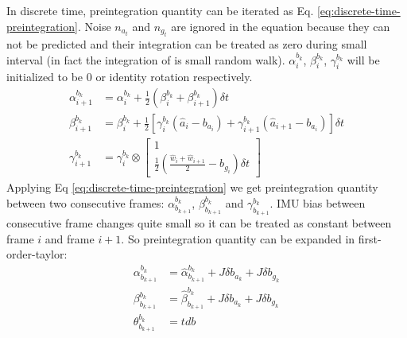 In discrete time, preintegration quantity can be iterated as Eq. \ref{eq:discrete-time-preintegration}. Noise $n_{a_t}$ and $n_{g_t}$ are ignored in the equation because they can not be predicted and their integration can be treated as zero during small interval (in fact the integration of is small random walk). $\alpha_i^{b_k}$, $\beta_i^{b_k}$, $\gamma_i^{b_k}$ will be initialized to be 0 or identity rotation respectively.
\begin{equation} \label{eq:discrete-time-preintegration}
	\begin{split}
		\alpha_{i+1}^{b_k} &= \alpha_i^{b_k} + \frac12(\beta_i^{b_k}+\beta_{i+1}^{b_k})\delta{t} \\
		\beta_{i+1}^{b_k} &= \beta_i^{b_k} + \frac12\left[\gamma_i^{b_k}(\hat{a}_i-b_{a_i})+\gamma_{i+1}^{b_k}(\hat{a}_{i+1}-b_{a_i})\right]\delta{t} \\
		\gamma_{i+1}^{b_k} &= \gamma_i^{b_k} \otimes
		\begin{bmatrix}
			1 \\ \frac12(\frac{\hat{w}_i+\hat{w}_{i+1}}2-b_{g_i})\delta{t}
		\end{bmatrix}
	\end{split}
\end{equation}
Applying Eq \ref{eq:discrete-time-preintegration} we get preintegration quantity between two consecutive frames: $\alpha_{b_{k+1}}^{b_k}$, $\beta_{b_{k+1}}^{b_k}$ and $\gamma_{b_{k+1}}^{b_k}$. IMU bias between consecutive frame changes quite small so it can be treated as constant between frame $i$ and frame $i+1$.
So preintegration quantity can be expanded in first-order-taylor:
\begin{equation}
	\begin{split}
		\alpha_{b_{k+1}}^{b_k} &= \hat{\alpha}_{b_{k+1}}^{b_k}+J\delta{b_{a_k}}+J\delta{b_{g_k}} \\
		\beta_{b_{k+1}}^{b_k} &= \hat{\beta}_{b_{k+1}}^{b_k}+J\delta{b_{a_k}}+J\delta{b_{g_k}} \\
		\theta_{b_{k+1}}^{b_k} &= tdb
	\end{split}
\end{equation}
